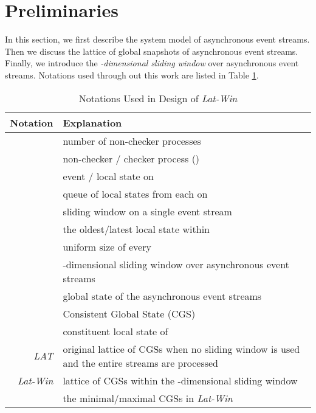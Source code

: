 \documentclass[12pt,journal,letterpaper,compsoc]{IEEEtran}
\begin{document}
\section{Preliminaries}
\label{sec:preliminaries}

In this section, we first describe the system model of asynchronous event streams. Then we discuss the lattice of global snapshots of asynchronous event streams. Finally, we introduce the {\it -dimensional sliding window} over asynchronous event streams. Notations used through out this work are listed in Table \ref{T:Notations-Model}.
\begin{table}[htbp]
\caption{Notations Used in Design of {\it Lat-Win}}
\label{T:Notations-Model} \centering
\begin{tabular}{r | l}
\hline
Notation & Explanation \\
\hline
\hline

 & number of non-checker processes \\

 & non-checker / checker process () \\

 & event / local state on  \\

 & queue of local states from each  on  \\

 & sliding window on a single event stream \\

 & the oldest/latest local state within  \\

 & uniform size of every  \\

 & -dimensional sliding window over asynchronous event streams \\

 & global state of the asynchronous event streams \\

 & Consistent Global State (CGS) \\

 &  constituent local state of  \\

{\it LAT} & original lattice of CGSs when no sliding window is used and the entire streams are processed \\

{\it Lat-Win} & lattice of CGSs within the -dimensional sliding window \\

 &  the minimal/maximal CGSs in {\it Lat-Win} \\

\hline
\end{tabular}
\end{table}
\end{document}
